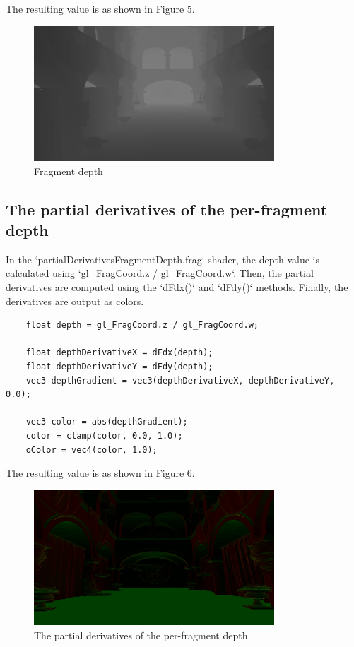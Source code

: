 \documentclass[10pt]{article}
\begin{document}
\noindent The resulting value is as shown in Figure 5.

\begin{figure}[htbp]
    \centering
    \includegraphics[width=9cm]{1.4_depthcolor.png}
    \caption{Fragment depth}
\end{figure}

\subsection{The partial derivatives of the per-fragment depth}

\noindent In the `partialDerivativesFragmentDepth.frag` shader, the depth value is calculated using `gl\_FragCoord.z / gl\_FragCoord.w`. Then, the partial derivatives are computed using the `dFdx()` and `dFdy()` methods. Finally, the derivatives are output as colors.

\begin{lstlisting}
    float depth = gl_FragCoord.z / gl_FragCoord.w;
    
    float depthDerivativeX = dFdx(depth);
    float depthDerivativeY = dFdy(depth);
    vec3 depthGradient = vec3(depthDerivativeX, depthDerivativeY, 0.0);
    
    vec3 color = abs(depthGradient);
    color = clamp(color, 0.0, 1.0);
    oColor = vec4(color, 1.0);
\end{lstlisting}

\noindent The resulting value is as shown in Figure 6.

\begin{figure}[htbp]
    \centering
    \includegraphics[width=9cm]{1.4_partialDerivativesFragmentDepth.png}
    \caption{The partial derivatives of the per-fragment depth}
\end{figure}
\end{document}
